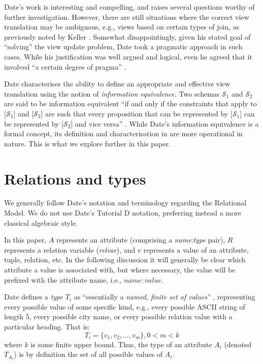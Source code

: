 \documentclass{sig-alternate-05-2015}
\newcounter{constraint}
\newcommand{\T}[1]{\ensuremath{T_{#1}}}
\newcommand{\SC}[1]{\ensuremath{\mathcal{S}_{#1}}}
\begin{document}
Date's work is interesting and compelling, and raises several questions worthy of further investigation. However, there are still situations where the correct view translation may be ambiguous, e.g., views based on certain types of join, as previously noted by Keller \cite{Keller.A-1985a-Algorithms}. Somewhat disappointingly, given his stated goal of ``solving'' the view update problem, Date took a pragmatic approach in such cases. While his justification was well argued and logical, even he agreed that it involved ``a certain degree of pragma'' \cite{Date.C-2013a-View}.

Date characterises the ability to define an appropriate and effective view translation using the notion of \emph{information equivalence}. Two schemas \(\SC{1}\) and \(\SC{2}\) are said to be information equivalent ``if and only if the constraints that apply to [\(\SC{1}\)] and [\(\SC{2}\)] are such that every proposition that can be represented by [\(\SC{1}\)] can be represented by [\(\SC{2}\)] and vice versa'' \cite{Date.C-2013a-View}. While Date's information equivalence is a formal concept, its definition and characterisation in \cite{Date.C-2013a-View} are more operational in nature. This is what we explore further in this paper.




\section{Relations and types}
\label{sec-relations-types}

\noindent We generally follow Date's \cite{Date.C-2012a-SQL-and-Relational} notation and terminology regarding the Relational Model. We do not use Date's Tutorial D notation, preferring instead a more classical algebraic style.

In this paper, \(A\) represents an attribute (comprising a \emph{name}:\emph{type} pair), \(R\) represents a relation variable (\emph{relvar}), and \(v\) represents a value of an attribute, tuple, relation, etc. In the following discussion it will generally be clear which attribute a value is associated with, but where necessary, the value will be prefixed with the attribute name, i.e., \(\mathit{name}\colon\mathit{value}\).

Date defines a \emph{type} \(\T{i}\) as ``essentially a \emph{named, finite set of values}'' \cite{Date.C-2012a-SQL-and-Relational}, representing every possible value of some specific kind, e.g., every possible ASCII string of length 5, every possible city name, or every possible relation value with a particular heading. That is:
\begin{equation}\label{eqn-type}
    \T{i} = \{v_{1}, v_{2}, \dotsc, v_{m}\}, 0 < m < k
\end{equation}
where \(k\) is some finite upper bound. Thus, the type of an attribute \(A_{i}\) (denoted \(\T{A_{i}}\)) is by definition the set of all possible values of \(A_{i}\).
\end{document}
